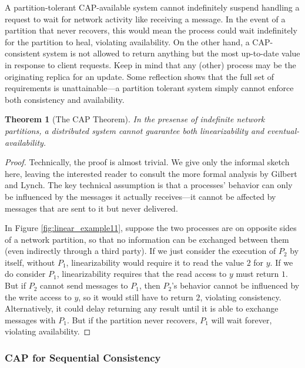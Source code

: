 \documentclass[]             %
{NASA}                       %
\newtheorem{theorem}{Theorem}[section]
\theoremstyle{definition}
\begin{document}
A partition-tolerant CAP-available system cannot indefinitely suspend
handling a request to wait for network activity like receiving a
message. In the event of a partition that never recovers, this would
mean the process could wait indefinitely for the partition to heal,
violating availability. On the other hand, a CAP-consistent system is
not allowed to return anything but the most up-to-date value in response
to client requests. Keep in mind that any (other) process may be the
originating replica for an update. Some reflection shows that the full
set of requirements is unattainable---a partition tolerant system simply
cannot enforce both consistency and availability.

\begin{theorem}[The CAP Theorem]
  \label{thm:cap}
  In the presense of indefinite network partitions, a distributed system
  cannot guarantee both linearizability and eventual-availability.
\end{theorem}
\begin{proof}
  Technically, the proof is almost trivial. We give only the informal
  sketch here, leaving the interested reader to consult the more formal
  analysis by Gilbert and Lynch. The key technical assumption is that a
  processes' behavior can only be influenced by the messages it actually
  receives---it cannot be affected by messages that are sent to it but
  never delivered.

  In Figure \ref{fig:linear_example11}, suppose the two processes are on
  opposite sides of a network partition, so that no information can be
  exchanged between them (even indirectly through a third party). If we
  just consider the execution of $P_2$ by itself, without $P_1$,
  linearizability would require it to read the value $2$ for $y$. If we
  do consider $P_1$, linearizability requires that the read access to
  $y$ must return $1$. But if $P_2$ cannot send messages to $P_1$, then
  $P_2$'s behavior cannot be influenced by the write access to $y$, so
  it would still have to return $2$, violating
  consistency. Alternatively, it could delay returning any result until
  it is able to exchange messages with $P_1$. But if the partition never
  recovers, $P_1$ will wait forever, violating availability.
\end{proof}

\subsubsection{CAP for Sequential Consistency}
\end{document}
